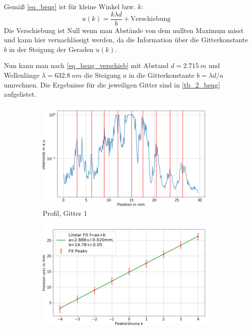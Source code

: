 \documentclass[
	a4paper,
	12pt,
	pagesize,
	ngerman
]{scrartcl}
\begin{document}
 Gemäß \cref{eq_beug} ist für kleine Winkel bzw. $k$:
 \begin{equation}
	 \label{eq_beug_verschieb}
	 u(k) = \frac{k\lambda d}{b} + \text{Verschiebung}
 \end{equation}
 Die Verschiebung ist Null wenn man Abstände von dem nullten Maximum misst und kann hier vernachlässigt werden, da die Information über die Gitterkonstante $b$ in der Steigung der Geraden $u(k)$.

 Nun kann man nach \cref{eq_beug_verschieb} mit Abstand $d=\SI{2.715}{m}$ und Wellenlänge $\lambda=\SI{632.8}{nm}$ die Steigung $a$ in die Gitterkonstante $b=\lambda d/a$ umrechnen.
 Die Ergebnisse für die jeweiligen Gitter sind in \cref{tb_2_beug} aufgelistet.

\begin{figure}[H]
        \centering
        \begin{subfigure}[b]{0.475\textwidth}
            \centering
            \includegraphics[width=\textwidth]{img/2/2_gitter_g1}
            \caption%
            {Profil, Gitter 1}
            \label{fig_2_profil_g1}
        \end{subfigure}
        \hfill
        \begin{subfigure}[b]{0.475\textwidth}
            \centering
            \includegraphics[width=\textwidth]{img/2/2_gitter_g1_fit}

\end{subfigure}
\end{figure}
\end{document}
